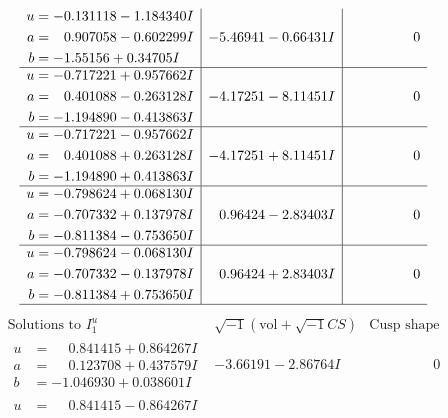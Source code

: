 \documentclass[1p]{elsarticle_modified}
\theoremstyle{definition}
\newcommand{\I}{\sqrt{-1}}
\begin{document}
$$\begin{array}{c|c|c}
\begin{aligned}
u &= -0.131118 - 1.184340 I \\
a &= \phantom{-}0.907058 - 0.602299 I \\
b &= -1.55156 + 0.34705 I\end{aligned}
 & -5.46941 - 0.66431 I & \phantom{-0.000000 } 0 \\ \hline\begin{aligned}
u &= -0.717221 + 0.957662 I \\
a &= \phantom{-}0.401088 - 0.263128 I \\
b &= -1.194890 - 0.413863 I\end{aligned}
 & -4.17251 - 8.11451 I & \phantom{-0.000000 } 0 \\ \hline\begin{aligned}
u &= -0.717221 - 0.957662 I \\
a &= \phantom{-}0.401088 + 0.263128 I \\
b &= -1.194890 + 0.413863 I\end{aligned}
 & -4.17251 + 8.11451 I & \phantom{-0.000000 } 0 \\ \hline\begin{aligned}
u &= -0.798624 + 0.068130 I \\
a &= -0.707332 + 0.137978 I \\
b &= -0.811384 - 0.753650 I\end{aligned}
 & \phantom{-}0.96424 - 2.83403 I & \phantom{-0.000000 } 0 \\ \hline\begin{aligned}
u &= -0.798624 - 0.068130 I \\
a &= -0.707332 - 0.137978 I \\
b &= -0.811384 + 0.753650 I\end{aligned}
 & \phantom{-}0.96424 + 2.83403 I & \phantom{-0.000000 } 0\\
 \hline 
 \end{array}$$\newpage$$\begin{array}{c|c|c}  
\text{Solutions to }I^u_{1}& \I (\text{vol} + \sqrt{-1}CS) & \text{Cusp shape}\\
 \hline 
\begin{aligned}
u &= \phantom{-}0.841415 + 0.864267 I \\
a &= \phantom{-}0.123708 + 0.437579 I \\
b &= -1.046930 + 0.038601 I\end{aligned}
 & -3.66191 - 2.86764 I & \phantom{-0.000000 } 0 \\ \hline\begin{aligned}
u &= \phantom{-}0.841415 - 0.864267 I \\

\end{aligned}
\end{array}$$
\end{document}
